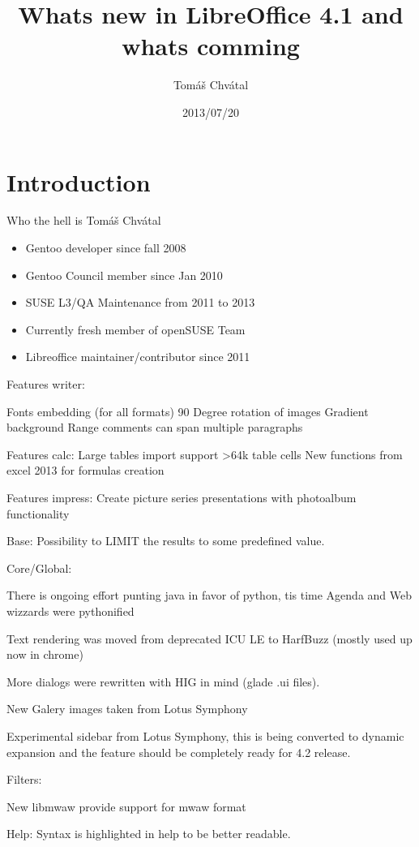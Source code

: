 \documentclass{beamer}
\author{Tom\'{a}\v{s} Chv\'{a}tal\newline {\small openSUSE Team}}
\title{Whats new in LibreOffice 4.1 and whats comming}
\date{2013/07/20}
\begin{document}
\begin{frame}[t,plain]
\titlepage
\end{frame}

\section{Introduction}

\begin{frame}{Who the hell is Tomáš Chvátal}
	\begin{itemize}
	\item Gentoo developer since fall 2008
	\item Gentoo Council member since Jan 2010
	\item SUSE L3/QA Maintenance from 2011 to 2013
	\item Currently fresh member of openSUSE Team
	\item Libreoffice maintainer/contributor since 2011
	\end{itemize}
\end{frame}

Features writer:

Fonts embedding (for all formats)
90 Degree rotation of images
Gradient background
Range comments can span multiple paragraphs

Features calc:
Large tables import support >64k table cells
New functions from excel 2013 for formulas creation

Features impress:
Create picture series presentations with photoalbum functionality

Base:
Possibility to LIMIT the results to some predefined value.

Core/Global:

There is ongoing effort punting java in favor of python, tis time Agenda and Web wizzards were pythonified

Text rendering was moved from deprecated ICU LE to HarfBuzz (mostly used up now in chrome)

More dialogs were rewritten with HIG in mind (glade .ui files).

New Galery images taken from Lotus Symphony

Experimental sidebar from Lotus Symphony, this is being converted to dynamic expansion and the feature should be completely ready for 4.2 release.

Filters:

New libmwaw provide support for mwaw format

Help:
Syntax is highlighted in help to be better readable.
\end{document}

